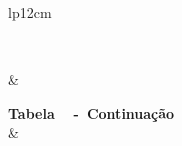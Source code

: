 \begin{longtable}{lp{12cm}}

\caption{\textbf{Histórico do Ensino de Empreendedorismo no Brasil}}\label{tabela_1} \\ \hline \hline


\hline {} & \\ \hline 

\endfirsthead


%

{{\bfseries Tabela \tabname \ \thetable{} -\ \textbf{Continuação}}}\\

\hline {} &   \\ \hline 

\endhead

\hline {} \\ \hline

\endfoot
\hline {} \\ \hline

\endfoot
\hline {} \\ \hline
\hline \hline

\endlastfoot



\end{longtable}
